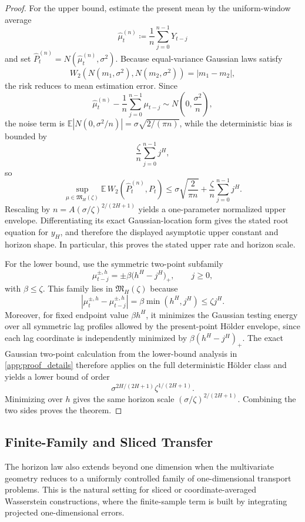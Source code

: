\begin{proof}
For the upper bound, estimate the present mean by the uniform-window average
\[
  \widehat\mu_t^{(n)}\coloneqq \frac{1}{n}\sum_{j=0}^{n-1}Y_{t-j}
\]
and set $\widehat P_t^{(n)}=N(\widehat\mu_t^{(n)},\sigma^2)$. Because equal-variance
Gaussian laws satisfy
\[
  W_2\!\left(N(m_1,\sigma^2),N(m_2,\sigma^2)\right)=|m_1-m_2|,
\]
the risk reduces to mean estimation error. Since
\[
  \widehat\mu_t^{(n)}-\frac{1}{n}\sum_{j=0}^{n-1}\mu_{t-j}
  \sim N\!\left(0,\frac{\sigma^2}{n}\right),
\]
the noise term is
$\mathbb E|N(0,\sigma^2/n)|=\sigma\sqrt{2/(\pi n)}$, while the deterministic bias is bounded by
\[
  \frac{\zeta}{n}\sum_{j=0}^{n-1} j^H,
\]
so
\[
  \sup_{\mu\in\mathfrak M_H(\zeta)}
  \mathbb E\,W_2\!\left(\widehat P_t^{(n)},P_t\right)
  \le
  \sigma\sqrt{\frac{2}{\pi n}} + \frac{\zeta}{n}\sum_{j=0}^{n-1} j^H.
\]
Rescaling by $n=A(\sigma/\zeta)^{2/(2H+1)}$ yields a one-parameter normalized
upper envelope. Differentiating its exact Gaussian-location form gives the stated
root equation for $y_H$, and therefore the displayed asymptotic upper constant
and horizon shape. In particular, this proves the stated upper rate and horizon
scale.

For the lower bound, use the symmetric two-point subfamily
\[
  \mu_{t-j}^{\pm,h}=\pm \beta\bigl(h^H-j^H\bigr)_+,
  \qquad j\ge 0,
\]
with $\beta\le \zeta$. This family lies in $\mathfrak M_H(\zeta)$ because
\[
  |\mu_t^{\pm,h}-\mu_{t-j}^{\pm,h}|=\beta\min(h^H,j^H)\le \zeta j^H.
\]
Moreover, for fixed endpoint value $\beta h^H$, it minimizes the Gaussian testing
energy over all symmetric lag profiles allowed by the present-point H\"older
envelope, since each lag coordinate is independently minimized by
$\beta(h^H-j^H)_+$. The exact Gaussian two-point calculation from the lower-bound
analysis in \cref{app:proof_details} therefore applies on the full deterministic H\"older class and
yields a lower bound of order
\[
  \sigma^{2H/(2H+1)}\zeta^{1/(2H+1)}.
\]
Minimizing over $h$ gives the same horizon scale $(\sigma/\zeta)^{2/(2H+1)}$.
Combining the two sides proves the theorem.
\end{proof}

\subsection{Finite-Family and Sliced Transfer}

The horizon law also extends beyond one dimension when the multivariate geometry
reduces to a uniformly controlled family of one-dimensional transport problems.
This is the natural setting for sliced or coordinate-averaged Wasserstein
constructions, where the finite-sample term is built by integrating projected
one-dimensional errors.

